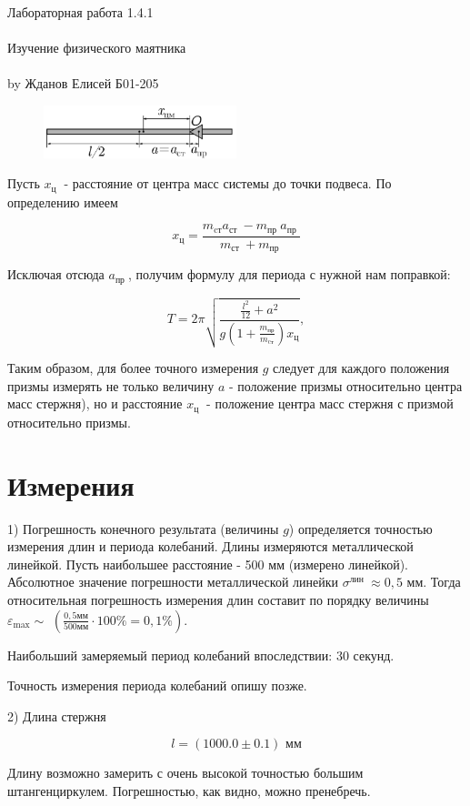 \documentclass{astroedu-lab}
\begin{document}
\begin{problem}{\huge Лабораторная работа 1.4.1\\\\Изучение физического маятника\\\\by Жданов Елисей Б01-205}
\begin{figure}
\includegraphics[width=0.5\textwidth]{theory_2.png}
\caption{}
\label{ris:image}
\end{figure} Пусть \(x_{\text {ц }}\) - расстояние от центра масс системы до точки подвеса. По определению имеем

\[
x_{\text{ц}}=\frac{m_{\mathrm{cт}} a_{\text {ст }}-m_{\text {пр }} a_{\text {пр }}}{m_{\text {ст }}+m_{\text {пр }}}
\]

Исключая отсюда \(a_{\text {пр }}\), получим формулу для периода с нужной нам поправкой:

\[
T=2 \pi \sqrt{\frac{\frac{l^{2}}{12}+a^{2}}{g\left(1+\frac{m_{\text{пр}}}{m_{\text{cт}}}\right) x_{\text{ц}}}},
\]

Таким образом, для более точного измерения \(g\) следует для каждого положения призмы измерять не только величину \(a\) - положение призмы относительно центра масс стержня), но и расстояние \(x_{\text {ц }}\) - положение центра масс стержня с призмой относительно призмы.

\section{Измерения}

1) Погрешность конечного результата (величины \(g\)) определяется точностью измерения длин и периода колебаний. Длины измеряются металлической линейкой. Пусть наибольшее расстояние - 500 мм (измерено линейкой). Абсолютное значение погрешности металлической линейки \(\sigma^{\text {лин }} \approx 0,5\) мм. Тогда относительная погрешность измерения длин составит по порядку величины \(\varepsilon_{\max } \sim\) \(\left( \frac{0,5 \text{мм}}{500 \text{мм}} \cdot 100 \%=0,1 \%\right)\).

Наибольший замеряемый период колебаний впоследствии: 30 секунд. 

Точность измерения периода колебаний опишу позже.

2) Длина стержня

\begin{equation}
	l = (1000.0 \pm 0.1) \text{ мм}
\end{equation}

Длину возможно замерить с очень высокой точностью большим штангенциркулем. Погрешностью, как видно, можно пренебречь.


\end{problem}
\end{document}
